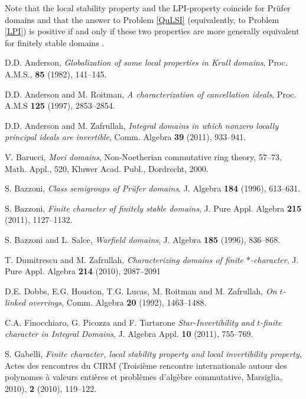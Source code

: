 \documentclass[12pt]{amsart}
\theoremstyle{definition}
\begin{document}
Note that the local stability property and the LPI-property coincide for Pr\"ufer domains \cite[Proposition 3.3]{B4} and that the answer to Problem \ref{QuLSI} (equivalently, to Problem \ref{LPI}) is positive if and only if these two properties are more generally equivalent for finitely stable domains \cite[Question 6]{B4}. 

\begin{thebibliography}{9}

 D.D. Anderson, \emph{Globalization of some local properties in Krull domains}, Proc. A.M.S., {\bf 85} (1982), 141--145.

  D.D. Anderson and M. Roitman, \emph{A characterization of cancellation ideals}, Proc. A.M.S {\bf 125} (1997),  2853--2854.

 D.D. Anderson and M. Zafrullah, \emph{Integral domains in which nonzero locally principal ideals are invertible}, Comm. Algebra {\bf 39} (2011), 933--941.

 V. Barucci, \emph{Mori domains}, Non-Noetherian commutative ring theory, 57--73, Math. Appl., 520, Kluwer Acad. Publ., Dordrecht, 2000. 

 S. Bazzoni, \emph{Class semigroups of Pr\"ufer domains}, J. Algebra {\bf 184} (1996), 613--631.

 S. Bazzoni, \emph{Finite character of finitely stable domains}, J. Pure Appl. Algebra {\bf 215} (2011), 1127--1132.

 S. Bazzoni and L. Salce, \emph{Warfield domains}, J. Algebra {\bf 185} (1996), 836--868.

 T. Dumitrescu and M. Zafrullah, \emph{Characterizing domains of finite $\ast$-character}, J. Pure Appl. Algebra \textbf{214} (2010), 2087--2091
 
  D.E. Dobbs, E.G. Houston, T.G. Lucas, M. Roitman and M. Zafrullah, \emph{On $t$-linked overrings}, Comm. Algebra \textbf{20} (1992), 1463--1488.

 C.A. Finocchiaro, G. Picozza and F. Tartarone \emph{Star-Invertibility and $t$-finite character in Integral Domains}, J. Algebra Appl. \textbf{10} (2011), 755--769.

 S. Gabelli, \emph{Finite character, local stability property and local invertibility property}, Actes des rencontres du CIRM (Troisi\`eme rencontre internationale autour des polynomes \`a valeurs enti\`eres et probl\`emes d'alg\`ebre commutative, Marsiglia, 2010), \textbf{2} (2010), 119--122.


\end{thebibliography}
\end{document}

